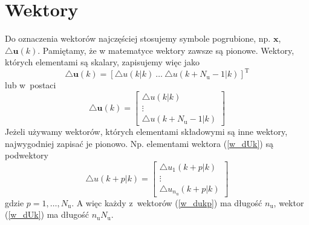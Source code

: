 \section{Wektory}
Do oznaczenia wektorów najczęściej stosujemy symbole pogrubione, np. $\boldsymbol{x}$, $\triangle\boldsymbol{u}(k)$. Pamiętamy, że w matematyce wektory zawsze są pionowe. Wektory, których elementami są skalary, zapisujemy więc jako
\begin{equation}
\triangle\boldsymbol{u}(k)=\left[\triangle u(k|k) \ \ldots \ \triangle u(k+N_{\mathrm{u}}-1|k) \right]^{\mathrm{T}}
\end{equation}
lub w~postaci
\begin{equation}
\triangle\boldsymbol{u}(k)=\left[
\begin{array}{c}
\triangle u(k|k)\\
\vdots\\
\triangle u(k+N_{\mathrm{u}}-1|k)
\end{array}
\right]
\label{w_dUk}
\end{equation}
Jeżeli używamy wektorów, których elementami składowymi są inne wektory, najwygodniej zapisać je pionowo. Np. elementami wektora (\ref{w_dUk}) są podwektory
\begin{equation}
\triangle u(k+p|k)=\left[
\begin{array}{c}
\triangle u_1(k+p|k)\\
\vdots\\
\triangle u_{n_{\mathrm{u}}}(k+p|k)
\end{array}
\right]
\label{w_dukp}
\end{equation}
gdzie $p=1,\ldots,N_{\mathrm{u}}$. A więc każdy z~wektorów (\ref{w_dukp}) ma długość $n_{\mathrm{u}}$, wektor (\ref{w_dUk}) ma długość $n_{\mathrm{u}}N_{\mathrm{u}}$.

